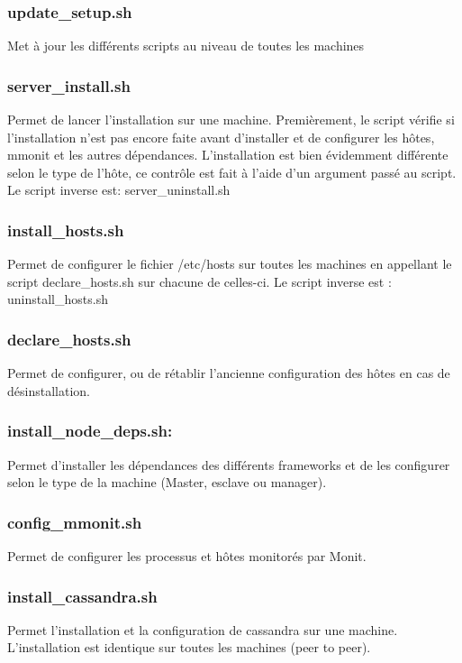 \documentclass[a4paper, 11pt, titlepage]{article}
\begin{document}
\subsubsection*{update\_setup.sh}
Met à jour les différents scripts au niveau de toutes les machines

\subsubsection*{server\_install.sh}
Permet de lancer l'installation sur une machine.
Premièrement, le script vérifie si l'installation n'est pas encore faite avant d'installer et de configurer les hôtes, mmonit et les autres dépendances. L'installation est bien évidemment différente selon le type de l'hôte, ce contrôle est fait à l'aide d'un argument passé au script. Le script inverse est: server\_uninstall.sh

\subsubsection*{install\_hosts.sh}
Permet de configurer le fichier /etc/hosts sur toutes les machines en appellant le script declare\_hosts.sh sur chacune de celles-ci. Le script inverse est : uninstall\_hosts.sh


\subsubsection*{declare\_hosts.sh}
Permet de configurer, ou de rétablir l'ancienne configuration des hôtes en cas de désinstallation.

\subsubsection*{install\_node\_deps.sh:}
Permet d'installer les dépendances des différents frameworks et de les configurer selon le type de la machine (Master, esclave ou manager).

\subsubsection*{config\_mmonit.sh}
Permet de configurer les processus et hôtes monitorés par Monit.

\subsubsection*{install\_cassandra.sh}
Permet l'installation et la configuration de cassandra sur une machine. L'installation est identique sur toutes les machines (peer to peer).
\end{document}
